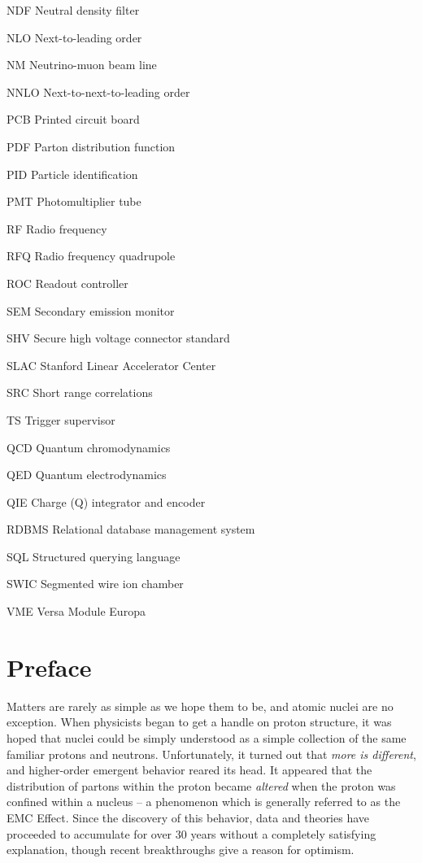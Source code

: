 \documentclass[edeposit,fullpage]{uiucthesis2009}
\begin{document}
\begin{symbollist*}
	\item[NDF] Neutral density filter
	\item[NLO] Next-to-leading order
	\item[NM] Neutrino-muon beam line
	\item[NNLO] Next-to-next-to-leading order
	\item[PCB] Printed circuit board
	\item[PDF] Parton distribution function
	\item[PID] Particle identification
	\item[PMT] Photomultiplier tube
	\item[RF] Radio frequency
	\item[RFQ] Radio frequency quadrupole
	\item[ROC] Readout controller
	\item[SEM] Secondary emission monitor
	\item[SHV] Secure high voltage connector standard
	\item[SLAC] Stanford Linear Accelerator Center
	\item[SRC] Short range correlations
	\item[TS] Trigger supervisor
	\item[QCD] Quantum chromodynamics
	\item[QED] Quantum electrodynamics
	\item[QIE] Charge (Q) integrator and encoder
	\item[RDBMS] Relational database management system
	\item[SQL] Structured querying language
	\item[SWIC] Segmented wire ion chamber
	\item[VME] Versa Module Europa
\end{symbollist*}

\mainmatter

\chapter*{Preface}

Matters are rarely as simple as we hope them to be, and atomic nuclei are no exception. When physicists began to get a handle on proton structure, it was hoped that nuclei could be simply understood as a simple collection of the same familiar protons and neutrons. Unfortunately, it turned out that \emph{more is different}, and higher-order emergent behavior reared its head. It appeared that the distribution of partons within the proton became \emph{altered} when the proton was confined within a nucleus -- a phenomenon which is generally referred to as the EMC Effect. Since the discovery of this behavior, data and theories have proceeded to accumulate for over 30 years without a completely satisfying explanation, though recent breakthroughs give a reason for optimism.
\end{document}
